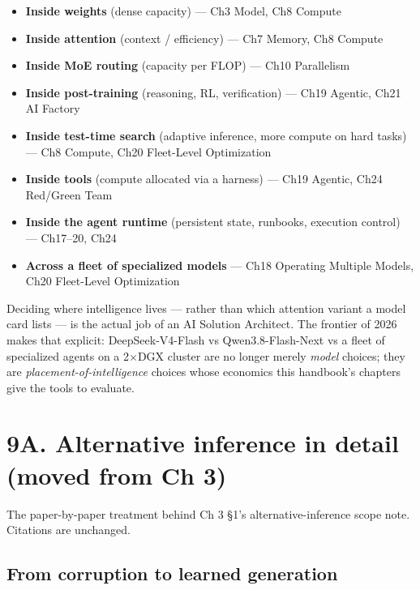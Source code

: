 \begin{itemize}
\tightlist
\item
  \textbf{Inside weights} (dense capacity) --- Ch3 Model, Ch8 Compute
\item
  \textbf{Inside attention} (context / efficiency) --- Ch7 Memory, Ch8
  Compute
\item
  \textbf{Inside MoE routing} (capacity per FLOP) --- Ch10 Parallelism
\item
  \textbf{Inside post-training} (reasoning, RL, verification) --- Ch19
  Agentic, Ch21 AI Factory
\item
  \textbf{Inside test-time search} (adaptive inference, more compute on
  hard tasks) --- Ch8 Compute, Ch20 Fleet-Level Optimization
\item
  \textbf{Inside tools} (compute allocated via a harness) --- Ch19
  Agentic, Ch24 Red/Green Team
\item
  \textbf{Inside the agent runtime} (persistent state, runbooks,
  execution control) --- Ch17--20, Ch24
\item
  \textbf{Across a fleet of specialized models} --- Ch18 Operating
  Multiple Models, Ch20 Fleet-Level Optimization
\end{itemize}

Deciding where intelligence lives --- rather than which attention
variant a model card lists --- is the actual job of an AI Solution
Architect. The frontier of 2026 makes that explicit: DeepSeek-V4-Flash
vs Qwen3.8-Flash-Next vs a fleet of specialized agents on a 2×DGX
cluster are no longer merely \emph{model} choices; they are
\emph{placement-of-intelligence} choices whose economics this handbook's
chapters give the tools to evaluate.

\section*{9A. Alternative inference in detail (moved from Ch
3)}\label{a.-alternative-inference-in-detail-moved-from-ch-3}

The paper-by-paper treatment behind Ch 3 §1's alternative-inference
scope note. Citations are unchanged.

\subsection{From corruption to learned
generation}\label{from-corruption-to-learned-generation}

